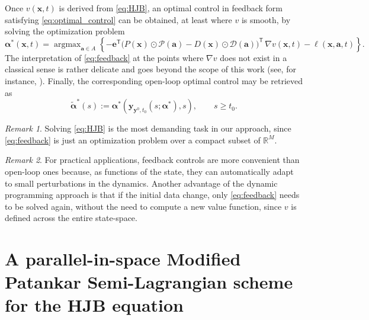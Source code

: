 \documentclass[10pt]{article}
\theoremstyle{remark}
\newtheorem{remark}{Remark}[section]
\newcommand{\R}{\mathbb{R}}
\newcommand{\tpose}{^\mathsf{T}}
\DeclareMathOperator*{\argmax}{argmax}
\theoremstyle{definition}
\theoremstyle{remark}
\begin{document}
Once $v(\bm{x},t)$ is derived from \eqref{eq:HJB}, an optimal control in feedback form satisfying \eqref{eq:optimal_control} can be obtained, at least where $v$ is smooth, by solving the optimization problem
\begin{equation}\label{eq:feedback}
\bm{\alpha}^* (\bm{x},t) = \argmax_{\bm{a} \in A} \left\{ -\bm{e}\tpose \big(P(\bm{x})\odot \mathcal{P}(\bm{a}) - D(\bm{x})\odot \mathcal{D}(\bm{a}) \big)\tpose \,  \nabla v (\bm{x},t) -\ell(\bm{x},\bm{a},t) \right\}.
\end{equation}
The interpretation of \eqref{eq:feedback} at the points where $\nabla v$ does not exist in a classical sense is rather delicate and goes beyond the scope of this work (see, for instance, \cite[Section III.2]{BardiCapuzzoDocetta2008}). Finally, the corresponding open-loop optimal control may be retrieved as
\begin{equation}\label{eq:opt_contr_no_feed}
   \tilde{\bm{\alpha}}^* (s) := \bm{\alpha}^* (\bm{y}_{\bm{y}^0,t_0} (s; \bm{\alpha}^*),s), \qquad s \geq t_0. 
\end{equation}

\begin{remark}    
Solving \eqref{eq:HJB} is the most demanding task in our approach, since \eqref{eq:feedback} is just an optimization problem over a compact subset of $\R^M$.
\end{remark}

\begin{remark}
    For practical applications, feedback controls are more convenient than open-loop ones because, as functions of the state, they can automatically adapt to small perturbations in the dynamics. 
    Another advantage of the dynamic programming approach is that if the initial data change, only \eqref{eq:feedback} needs to be solved again, without the need to compute a new value function, since $v$ is defined across the entire state-space.
\end{remark}


\section{A parallel-in-space Modified Patankar Semi-Lagrangian scheme for the HJB equation}
\label{sec:MPSL}
\end{document}
